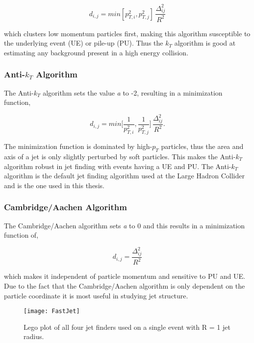 \begin{equation}
d_{i,j} = min[p^{2}_{T,i},p^{2}_{T,j}] \, \frac{\Delta^{2}_{ij}}{R^{2}}
\label{eq:kt}
\end{equation}

\noindent
which clusters low momentum particles first, making this algorithm susceptible to the underlying event (UE) or pile-up (PU).  Thus the $k_{T}$ algorithm is good at estimating any background present in a high energy collision. 

\subsubsection{Anti-$k_{T}$ Algorithm}
The Anti-$k_{T}$ algorithm sets the value \textit{a} to -2, resulting in a minimization function,

\begin{equation}
d_{i,j} = min \Bigg [\frac{1}{p^{2}_{T,i}}, \frac{1}{p^{2}_{T,j}} \Bigg ] \, \frac{\Delta^{2}_{ij}}{R^{2}}.
\label{eq:Akt}
\end{equation}

The minimization function is dominated by high-$p_{T}$ particles, thus the area and axis of a jet is only slightly perturbed by soft particles.  This makes the Anti-$k_{T}$ algorithm robust in jet finding with events having a UE and PU.  The Anti-$k_{T}$ algorithm is the default jet finding algorithm used at the Large Hadron Collider and is the one used in this thesis.

\subsubsection{Cambridge/Aachen Algorithm}

The Cambridge/Aachen algorithm sets \textit{a} to 0 and this results in a minimization function of,

\begin{equation}
d_{i,j} = \frac{\Delta^{2}_{ij}}{R^{2}}
\label{eq:CBalg}
\end{equation}

\noindent
which makes it independent of particle momentum and sensitive to PU and UE.  Due to the fact that the Cambridge/Aachen algorithm is only dependent on the particle coordinate it is most useful in studying jet structure.

\begin{figure}[h]
\texttt{[image: FastJet]}
\centering
\caption{Lego plot of all four jet finders used on a single event with R = 1 jet radius\cite{Atkin:2015msa}.}
\label{fig:AllJetFinder}
\end{figure}

